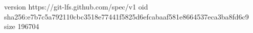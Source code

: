 version https://git-lfs.github.com/spec/v1
oid sha256:e7b7c5a792110cbc3518e77441f5825d6efcabaaf581e8664537eca3ba8fd6c9
size 196704
